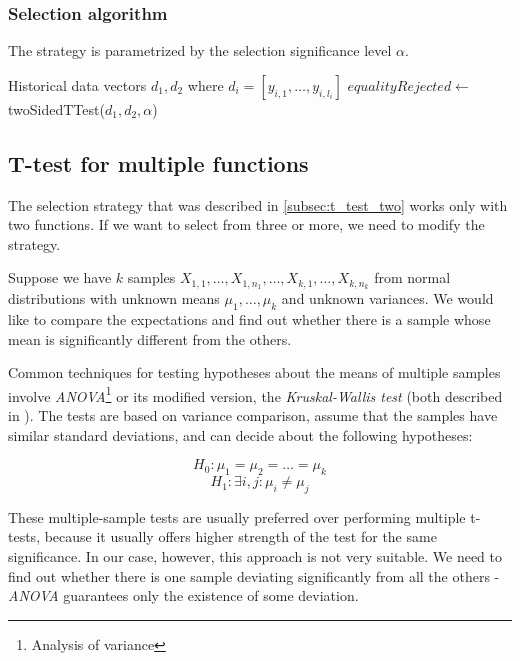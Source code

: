 \subsubsection{Selection algorithm}

The strategy is parametrized by the selection significance level $\alpha$.

\begin{algorithmic}[1] %
	\INPUT Historical data vectors $d_1,d_2$ where $d_i = [y_{i,1},\dots, y_{i,l_i}]$
	\State $equalityRejected \gets$ twoSidedTTest($d_1, d_2, \alpha$)
	\State {}
	\EndIf
	\State {}
	\Else 
	\State {}
	\EndIf
\end{algorithmic}

\subsection{T-test for multiple functions}
\label{subsec:t_test_multiple}

The selection strategy that was described in \ref{subsec:t_test_two} works only with two functions. If we want to select from three or more, we need to modify the strategy.

Suppose we have $k$ samples $X_{1,1}, \dots, X_{1, n_1}, \dots, X_{k,1}, \dots, X_{k, n_k}$ from normal distributions with unknown means $\mu_1, \dots, \mu_k$ and unknown variances. We would like to compare the expectations and find out whether there is a sample whose mean is significantly different from the others.

Common techniques for testing hypotheses about the means of multiple samples involve \textit{ANOVA}\footnote{Analysis of variance} or its modified version, the \textit{Kruskal-Wallis test} (both described in \cite{weiss_introductory_2010}). The tests are based on variance comparison, assume that the samples have similar standard deviations, and can decide about the following hypotheses:


\[
H_0: \mu_1 = \mu_2 = \dots = \mu_k
\]
\[
H_1: \exists i, j: \mu_i \neq \mu_j
\]

These multiple-sample tests are usually preferred over performing multiple t-tests, because it usually offers higher strength of the test for the same significance. In our case, however, this approach is not very suitable. We need to find out whether there is one sample deviating significantly from all the others - \textit{ANOVA} guarantees only the existence of some deviation.


